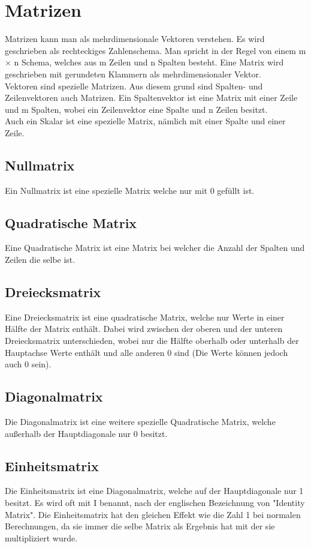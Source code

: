 \documentclass{article}
\begin{document}
	\section{Matrizen}
	Matrizen kann man als mehrdimensionale Vektoren verstehen. Es wird geschrieben als rechteckiges Zahlenschema. Man spricht in der Regel von einem m$\times$ n Schema, welches aus m Zeilen und n Spalten besteht. Eine Matrix wird geschrieben mit gerundeten Klammern als mehrdimensionaler Vektor. \\
	Vektoren sind spezielle Matrizen. Aus diesem grund sind Spalten- und Zeilenvektoren auch Matrizen. Ein Spaltenvektor ist eine Matrix mit einer Zeile und m Spalten, wobei ein Zeilenvektor eine Spalte und n Zeilen besitzt. \\
	Auch ein Skalar ist eine spezielle Matrix, nämlich mit einer Spalte und einer Zeile.
	\subsection{Nullmatrix}
	Ein Nullmatrix ist eine spezielle Matrix welche nur mit 0 gefüllt ist.
	\subsection{Quadratische Matrix}
	Eine Quadratische Matrix ist eine Matrix bei welcher die Anzahl der Spalten und Zeilen die selbe ist.
	\subsection{Dreiecksmatrix}
	Eine Dreiecksmatrix ist eine quadratische Matrix, welche nur Werte in einer Hälfte der Matrix enthält. Dabei wird zwischen der oberen und der unteren Dreiecksmatrix unterschieden, wobei nur die Hälfte oberhalb oder unterhalb der Hauptachse Werte enthält und alle anderen 0 sind (Die Werte können jedoch auch 0 sein).
	\subsection{Diagonalmatrix}
	Die Diagonalmatrix ist eine weitere spezielle Quadratische Matrix, welche außerhalb der Hauptdiagonale nur 0 besitzt.
	\subsection{Einheitsmatrix}
	Die Einheitsmatrix ist eine Diagonalmatrix, welche auf der Hauptdiagonale nur 1 besitzt. Es wird oft mit I benannt, nach der englischen Bezeichnung von "Identity Matrix". Die Einheitsmatrix hat den gleichen Effekt wie die Zahl 1 bei normalen Berechnungen, da sie immer die selbe Matrix als Ergebnis hat mit der sie multipliziert wurde.
\end{document}

